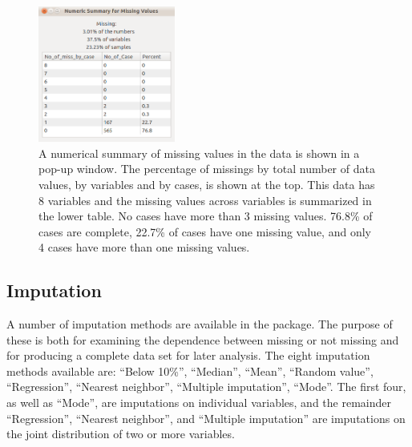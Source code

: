 \documentclass[english]{article}
\begin{document}
\begin{center}
%
\begin{figure}[h]
\begin{centering}
\includegraphics[width=0.4\textwidth]{Miss_fig2}
\par\end{centering}
\caption{A numerical summary of missing values in the data is shown in a pop-up window.  The percentage of missings by total number of data values, by variables and by cases, is shown at the top. This data has 8 variables and the missing values across variables is summarized in the lower table. No cases have more than 3 missing values.  76.8\% of cases are complete, 22.7\% of cases have one missing value, and only 4 cases have more than one missing values.}
\label{fig: num-summry}
\end{figure}

\par\end{center}

\subsection{Imputation}

A number of imputation methods are available in the package. The purpose of these is both for examining the dependence between missing or not missing and for producing a complete data set for later analysis.  The eight imputation methods available are: 
``Below 10\%'', ``Median'', ``Mean'', 
``Random value'', ``Regression'', ``Nearest neighbor'', 
``Multiple imputation'', ``Mode''. 
The first four, as well as ``Mode'', are imputations on individual variables, and the remainder  ``Regression'', ``Nearest neighbor'', and ``Multiple imputation'' are imputations on the joint distribution of two or more  variables.
\end{document}

